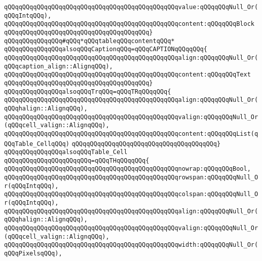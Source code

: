 \verb|qQQqqQQqqQQqqQQqqQQqqQQqqQQqqQQqqQQqqQQqqQQqqQQqvalue:qQQqqQQqNull_Or(qQQqIntqQQq),|\newline
\verb|qQQqqQQqqQQqqQQqqQQqqQQqqQQqqQQqqQQqqQQqqQQqqQQqcontent:qQQqqQQqBlock|\newline
\verb|qQQqqQQqqQQqqQQqqQQqqQQqqQQqqQQqqQQqqQQq}|\newline
\newline
\verb|qQQqqQQqqQQqqQQq#qQQq*qQQqtableqQQqcontentqQQq*|\newline
\verb|qQQqqQQqqQQqqQQqalsoqQQqCaptionqQQq=qQQqCAPTIONqQQqqQQq{|\newline
\verb|qQQqqQQqqQQqqQQqqQQqqQQqqQQqqQQqqQQqqQQqqQQqqQQqalign:qQQqqQQqNull_Or(qQQqcaption_align::AlignqQQq),|\newline
\verb|qQQqqQQqqQQqqQQqqQQqqQQqqQQqqQQqqQQqqQQqqQQqqQQqcontent:qQQqqQQqText|\newline
\verb|qQQqqQQqqQQqqQQqqQQqqQQqqQQqqQQqqQQqqQQq}|\newline
\verb|qQQqqQQqqQQqqQQqalsoqQQqTrqQQq=qQQqTRqQQqqQQq{|\newline
\verb|qQQqqQQqqQQqqQQqqQQqqQQqqQQqqQQqqQQqqQQqqQQqqQQqalign:qQQqqQQqNull_Or(qQQqhalign::AlignqQQq),|\newline
\verb|qQQqqQQqqQQqqQQqqQQqqQQqqQQqqQQqqQQqqQQqqQQqqQQqvalign:qQQqqQQqNull_Or(qQQqcell_valign::AlignqQQq),|\newline
\verb|qQQqqQQqqQQqqQQqqQQqqQQqqQQqqQQqqQQqqQQqqQQqqQQqcontent:qQQqqQQqList(qQQqTable_CellqQQq)|\newline
\verb|qQQqqQQqqQQqqQQqqQQqqQQqqQQqqQQqqQQqqQQq}|\newline
\verb|qQQqqQQqqQQqqQQqalsoqQQqTable_Cell|\newline
\verb|qQQqqQQqqQQqqQQqqQQqqQQq=qQQqTHqQQqqQQq{|\newline
\verb|qQQqqQQqqQQqqQQqqQQqqQQqqQQqqQQqqQQqqQQqqQQqqQQqnowrap:qQQqqQQqBool,|\newline
\verb|qQQqqQQqqQQqqQQqqQQqqQQqqQQqqQQqqQQqqQQqqQQqqQQqrowspan:qQQqqQQqNull_Or(qQQqIntqQQq),|\newline
\verb|qQQqqQQqqQQqqQQqqQQqqQQqqQQqqQQqqQQqqQQqqQQqqQQqcolspan:qQQqqQQqNull_Or(qQQqIntqQQq),|\newline
\verb|qQQqqQQqqQQqqQQqqQQqqQQqqQQqqQQqqQQqqQQqqQQqqQQqalign:qQQqqQQqNull_Or(qQQqhalign::AlignqQQq),|\newline
\verb|qQQqqQQqqQQqqQQqqQQqqQQqqQQqqQQqqQQqqQQqqQQqqQQqvalign:qQQqqQQqNull_Or(qQQqcell_valign::AlignqQQq),|\newline
\verb|qQQqqQQqqQQqqQQqqQQqqQQqqQQqqQQqqQQqqQQqqQQqqQQqwidth:qQQqqQQqNull_Or(qQQqPixelsqQQq),|\newline
